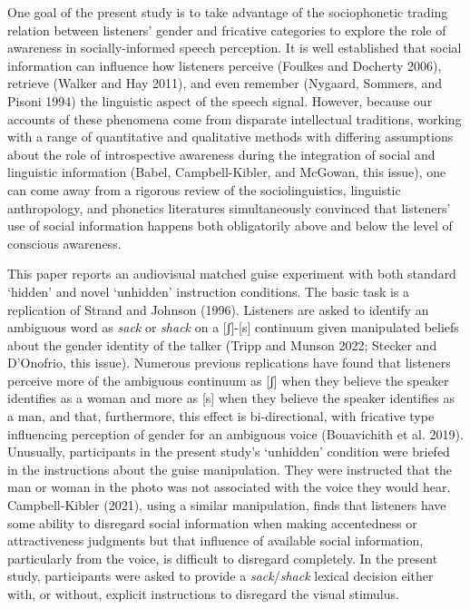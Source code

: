 \documentclass[
  letterpaper,
  DIV=11,
  numbers=noendperiod]{scrartcl}
\begin{document}
One goal of the present study is to take advantage of the sociophonetic
trading relation between listeners' gender and fricative categories to
explore the role of awareness in socially-informed speech perception. It
is well established that social information can influence how listeners
perceive (Foulkes and Docherty 2006), retrieve (Walker and Hay 2011),
and even remember (Nygaard, Sommers, and Pisoni 1994) the linguistic
aspect of the speech signal. However, because our accounts of these
phenomena come from disparate intellectual traditions, working with a
range of quantitative and qualitative methods with differing assumptions
about the role of introspective awareness during the integration of
social and linguistic information (Babel, Campbell-Kibler, and McGowan,
this issue), one can come away from a rigorous review of the
sociolinguistics, linguistic anthropology, and phonetics literatures
simultaneously convinced that listeners' use of social information
happens both obligatorily above and below the level of conscious
awareness.

This paper reports an audiovisual matched guise experiment with both
standard `hidden' and novel `unhidden' instruction conditions. The basic
task is a replication of Strand and Johnson (1996). Listeners are asked
to identify an ambiguous word as \emph{sack} or \emph{shack} on a
{[}ʃ{]}-{[}s{]} continuum given manipulated beliefs about the gender
identity of the talker (Tripp and Munson 2022; Stecker and D'Onofrio,
this issue). Numerous previous replications have found that listeners
perceive more of the ambiguous continuum as {[}ʃ{]} when they believe
the speaker identifies as a woman and more as {[}s{]} when they believe
the speaker identifies as a man, and that, furthermore, this effect is
bi-directional, with fricative type influencing perception of gender for
an ambiguous voice (Bouavichith et al. 2019). Unusually, participants in
the present study's `unhidden' condition were briefed in the
instructions about the guise manipulation. They were instructed that the
man or woman in the photo was not associated with the voice they would
hear. Campbell-Kibler (2021), using a similar manipulation, finds that
listeners have some ability to disregard social information when making
accentedness or attractiveness judgments but that influence of available
social information, particularly from the voice, is difficult to
disregard completely. In the present study, participants were asked to
provide a \emph{sack}/\emph{shack} lexical decision either with, or
without, explicit instructions to disregard the visual stimulus.
\end{document}
